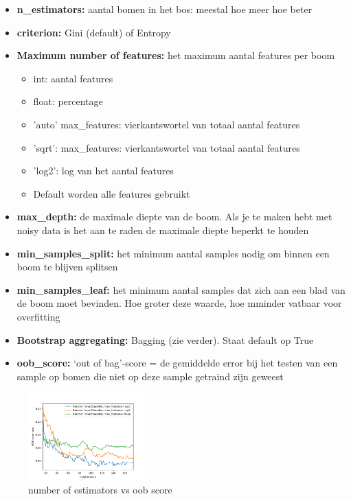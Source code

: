\documentclass{article}
\begin{document}
\begin{itemize}
    \item \textbf{n\_estimators:} aantal bomen in het bos: meestal hoe meer hoe beter
    \item \textbf{criterion: } Gini (default) of Entropy
    \item \textbf{Maximum number of features:} het maximum aantal features per boom
    \begin{itemize}
        \item int: aantal features
        \item float: percentage
        \item 'auto' max\_features: vierkantswortel van totaal aantal features
        \item 'sqrt': max\_features: vierkantswortel van totaal aantal features
        \item 'log2': log van het aantal features
        \item Default worden alle features gebruikt
    \end{itemize}
    \item \textbf{max\_depth:} de maximale diepte van de boom. Als je te maken hebt met noisy data is het aan te raden de maximale diepte beperkt te houden
    \item \textbf{min\_samples\_split:} het minimum aantal samples nodig om binnen een boom te blijven splitsen
    \item \textbf{min\_samples\_leaf:} het minimum aantal samples dat zich aan een blad van de boom moet bevinden. Hoe groter deze waarde, hoe mminder vatbaar voor overfitting
    \item \textbf{Bootstrap aggregating: } Bagging (zie verder). Staat default op True
    \item \textbf{oob\_score:} `out of bag'-score = de gemiddelde error bij het testen van een sample op bomen die niet op deze sample getraind zijn geweest
\end{itemize}

\begin{figure}[H]
    \centering
    \includegraphics[width=0.4\textwidth]{bagging-random-forest-trees2.png}
    \caption{number of estimators vs oob score}
\end{figure}
\end{document}
